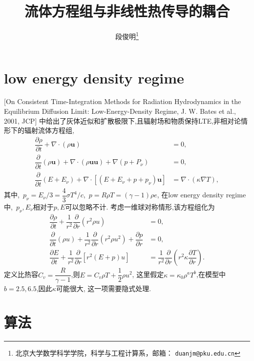 \documentclass[a4paper, 11pt]{ctexart}
\title{流体方程组与非线性热传导的耦合}
\author{段俊明\thanks{北京大学数学科学学院，科学与工程计算系，邮箱： {\tt duanjm@pku.edu.cn}} }
\numberwithin{equation}{section}
\numberwithin{figure}{section}
\newcommand\bu{\boldsymbol{u}}
\newcommand\pd[2]{\dfrac{\partial {#1}}{\partial {#2}}}
\begin{document}
\maketitle

\section{low energy density regime}
[On Consistent Time-Integration Methods for Radiation Hydrodynamics in
the Equilibrium Diffusion Limit: Low-Energy-Density Regime, J. W. Bates et al., 2001, JCP]
中给出了灰体近似和扩散极限下,且辐射场和物质保持LTE,非相对论情形下的辐射流体方程组,
\begin{align}
  \pd{\rho}{t}+\nabla\cdot(\rho\bu)&=0,\\
  \pd{}{t}(\rho\bu)+\nabla\cdot(\rho\bu\bu)+\nabla (p+P_\nu)&=0,\\
  \pd{}{t}(E+E_\nu)+\nabla\cdot[(E+E_\nu+p+p_\nu)\bu]&=\nabla\cdot(\kappa\nabla T),
\end{align}
其中,~$p_\nu=E_\nu/3=\dfrac43\sigma T^4/c$,~$p=R\rho T=(\gamma-1)\rho e$,
在low energy density regime中,~$p_\nu,E_\nu$相对于$p,E$可以忽略不计.
考虑一维球对称情形,该方程组化为
\begin{align}
  \pd{\rho}{t}+\dfrac{1}{r^2}\pd{}{r}(r^2\rho u)&=0,\\
  \pd{}{t}(\rho u)+\dfrac{1}{r^2}\pd{}{r}(r^2\rho u^2)+\pd{p}{r}&=0,\\
  \pd{E}{t}+\dfrac{1}{r^2}\pd{}{r}[r^2(E+p)u]&=
  \dfrac{1}{r^2}\pd{}{r}(r^2\kappa \pd{T}{r}).
\end{align}
定义比热容$C_v=\dfrac{R}{\gamma-1}$,则$E=C_v\rho T+\dfrac12\rho u^2$,
这里假定$\kappa=\kappa_0\rho^a T^b$,在模型中$b=2.5,6.5$,因此$\kappa$可能很大,
这一项需要隐式处理.

\section{算法}
\end{document}
